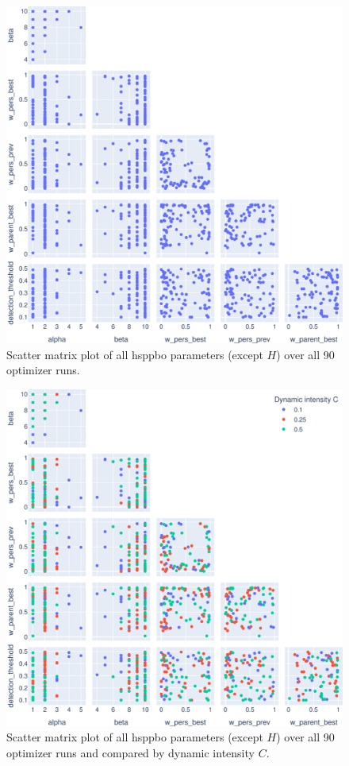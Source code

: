 \begin{figure}[h]
	\centering
	\includegraphics[width=\textwidth]{results/part2/param_scatter_matrix_None.svg}
	\caption[Scatter matrix plot of all \gls{hsppbo} parameters]{Scatter matrix plot of all \gls{hsppbo} parameters (except $H$) over all 90 optimizer runs.}
	\label{fig:parameter_scatter_matrix}
\end{figure}

\begin{figure}[h]
	\centering
	\includegraphics[width=\textwidth]{results/part2/param_scatter_matrix_dynamic.svg}
	\caption[Scatter matrix plot of all \gls{hsppbo} parameters compared by dynamic intensity]{Scatter matrix plot of all \gls{hsppbo} parameters (except $H$) over all 90 optimizer runs and compared by dynamic intensity $C$.}
	\label{fig:parameter_scatter_matrix_dynamic}
\end{figure}

